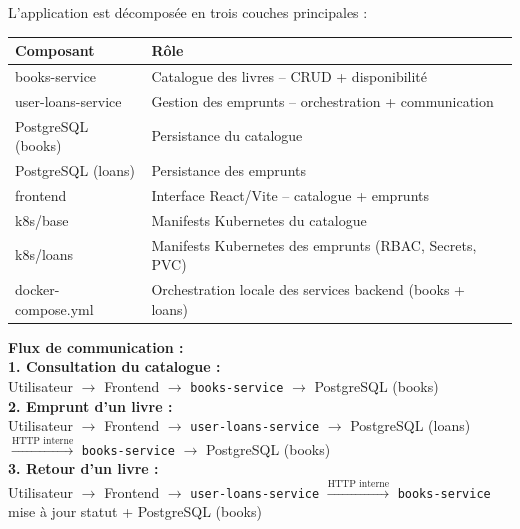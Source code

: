 \documentclass[12pt,a4paper]{article}
\begin{document}
L'application est décomposée en trois couches principales :

\begin{center}
\begin{tabularx}{\textwidth}{>{\ttfamily}p{4.5cm} X}
\toprule
\normalfont\textbf{Composant} & \textbf{Rôle} \\
\midrule
books-service        & Catalogue des livres -- CRUD + disponibilité \\
user-loans-service   & Gestion des emprunts -- orchestration + communication \\
PostgreSQL (books)   & Persistance du catalogue \\
PostgreSQL (loans)   & Persistance des emprunts \\
frontend             & Interface React/Vite -- catalogue + emprunts \\
k8s/base             & Manifests Kubernetes du catalogue \\
k8s/loans            & Manifests Kubernetes des emprunts (RBAC, Secrets, PVC) \\
docker-compose.yml   & Orchestration locale des services backend (books + loans) \\
\bottomrule
\end{tabularx}
\end{center}

\vspace{0.5cm}

\begin{infobox}
\textbf{Flux de communication :}\\[4pt]
\textbf{1. Consultation du catalogue :}\\
\quad Utilisateur $\rightarrow$ Frontend $\rightarrow$ \texttt{books-service} $\rightarrow$ PostgreSQL (books)\\[3pt]
\textbf{2. Emprunt d'un livre :}\\
\quad Utilisateur $\rightarrow$ Frontend $\rightarrow$ \texttt{user-loans-service} $\rightarrow$ PostgreSQL (loans)\\
\quad \phantom{Utilisateur $\rightarrow$ Frontend $\rightarrow$} $\xrightarrow{\text{HTTP interne}}$ \texttt{books-service} $\rightarrow$ PostgreSQL (books)\\[3pt]
\textbf{3. Retour d'un livre :}\\
\quad Utilisateur $\rightarrow$ Frontend $\rightarrow$ \texttt{user-loans-service} $\xrightarrow{\text{HTTP interne}}$ \texttt{books-service}\\
\quad {} mise à jour statut + PostgreSQL (books)
\end{infobox}
\end{document}

